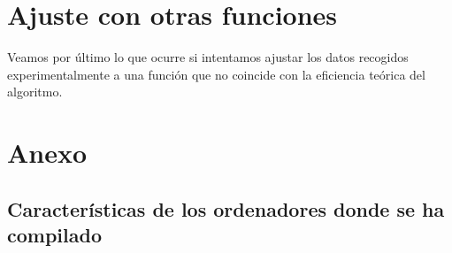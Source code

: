 \documentclass[11pt]{article}
\begin{document}
	
\section*{Ajuste con otras funciones}

	Veamos por último lo que ocurre si intentamos ajustar los datos recogidos experimentalmente a una función que no coincide con la eficiencia teórica del algoritmo.

	\begin{center}
		
	\end{center}

	\fontsize{10pt}{7.2}\selectfont
	\begin{center}
		
	\end{center}


\section*{Anexo}
\subsection*{Características de los ordenadores donde se ha compilado}
\end{document}
